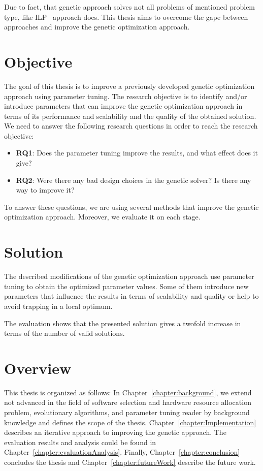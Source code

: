 Due to fact, that genetic approach solves not all problems of mentioned problem type, like ILP~\cite{gotz18} approach does.
This thesis aims to overcome the gape between approaches and improve the genetic optimization approach.


\section{Objective}
The goal of this thesis is to improve a previously developed genetic optimization approach using parameter tuning.
The research objective is to identify and/or introduce parameters that can improve the genetic optimization approach in terms of its performance and scalability and the quality of the obtained solution. We need to answer the following research questions in order to reach the research objective: 
\begin{itemize}
	\item \textbf{RQ1}: Does the parameter tuning improve the results, and what effect does it give?
	\item \textbf{RQ2}: Were there any bad design choices in the genetic solver? Is there any way to improve it?
\end{itemize}

To answer these questions, we are using several methods that improve the genetic optimization approach. Moreover, we evaluate it on each stage. 

\section{Solution}

The described modifications of the genetic optimization approach use parameter tuning to obtain the optimized parameter values. Some of them introduce new parameters that influence the results in terms of scalability and quality or help to avoid trapping in a local optimum.

The evaluation shows that the presented solution gives a twofold increase in terms of the number of valid solutions.


\section{Overview}
This thesis is organized as follows: In Chapter~\ref{chapter:background}, we extend not advanced in the field of software selection and hardware resource allocation problem, evolutionary algorithms, and parameter tuning reader by background knowledge and defines the scope of the thesis. Chapter~\ref{chapter:Implementation} describes an iterative approach to improving the genetic approach. The evaluation results and analysis could be found in Chapter~\ref{chapter:evaluationAnalysis}. Finally, Chapter~\ref{chapter:conclusion} concludes the thesis and Chapter~\ref{chapter:futureWork} describe the future work.
